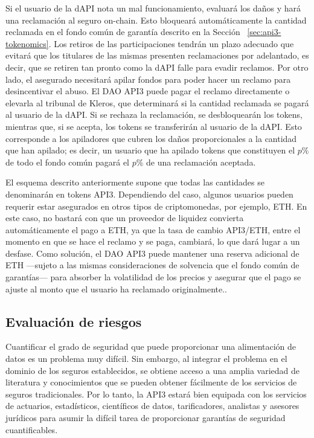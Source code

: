 \documentclass[11pt]{article}
\begin{document}
Si el usuario de la dAPI nota un mal funcionamiento, evaluará los daños y hará una reclamación al seguro on-chain. Esto bloqueará automáticamente la cantidad reclamada en el fondo común de garantía descrito en la Sección ~\ref{sec:api3-tokenomics}.
Los retiros de las participaciones tendrán un plazo adecuado que evitará que los titulares de las mismas presenten reclamaciones por adelantado, es decir, que se retiren tan pronto como la dAPI falle para evadir reclamos. Por otro lado, el asegurado necesitará apilar fondos para poder hacer un reclamo para desincentivar el abuso. El DAO API3 puede pagar el reclamo directamente o elevarla al tribunal de Kleros, que determinará si la cantidad reclamada se pagará al usuario de la dAPI. Si se rechaza la reclamación, se desbloquearán los tokens, mientras que, si se acepta, los tokens se transferirán al usuario de la dAPI. Esto corresponde a los apiladores que cubren los daños proporcionales a la cantidad que han apilado; es decir, un usuario que ha apilado tokens que constituyen el $p\%$ de todo el fondo común pagará el $p\%$ de una reclamación aceptada.

El esquema descrito anteriormente supone que todas las cantidades se denominarán en tokens API3. Dependiendo del caso, algunos usuarios pueden requerir estar asegurados en otros tipos de criptomonedas, por ejemplo, ETH. En este caso, no bastará con que un proveedor de liquidez convierta automáticamente el pago a ETH, ya que la tasa de cambio API3/ETH, entre el momento en que se hace el reclamo y se paga, cambiará, lo que dará lugar a un desfase. Como solución, el DAO API3 puede mantener una reserva adicional de ETH —sujeto a las mismas consideraciones de solvencia que el fondo común de garantías— para absorber la volatilidad de los precios y asegurar que el pago se ajuste al monto que el usuario ha reclamado originalmente..

\subsection{Evaluación de riesgos}
\label{sec:risk-assessment}

Cuantificar el grado de seguridad que puede proporcionar una alimentación de datos es un problema muy difícil. Sin embargo, al integrar el problema en el dominio de los seguros establecidos, se obtiene acceso a una amplia variedad de literatura y conocimientos que se pueden obtener fácilmente de los servicios de seguros tradicionales. Por lo tanto, la API3 estará bien equipada con los servicios de actuarios, estadísticos, científicos de datos, tarificadores, analistas y asesores jurídicos para asumir la difícil tarea de proporcionar garantías de seguridad cuantificables.
\end{document}

